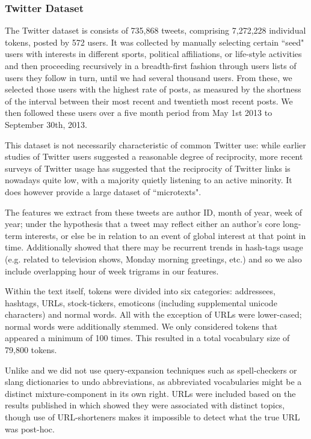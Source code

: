 \subsubsection*{Twitter Dataset}
The Twitter dataset is consists of 735,868 tweets, comprising 7,272,228 individual tokens, posted by 572 users. It was collected by manually selecting certain ``seed" users with interests in different sports, political affiliations, or life-style activities and then proceeding recursively in a breadth-first fashion through users lists of users they follow in turn, until we had several thousand users. From these, we selected those users with the highest rate of posts, as measured by the shortness of the interval between their most recent and twentieth most recent posts. We then followed these users over a five month period from May 1st 2013 to September 30th, 2013. 

This dataset is not necessarily characteristic of common Twitter use: while earlier studies of Twitter users suggested a reasonable degree of reciprocity\cite{Java2007}, more recent surveys of Twitter usage has suggested that the reciprocity of Twitter links is nowadays quite low, with a majority quietly listening to an active minority\cite{Kwak2010}. It does however provide a large dataset of ``microtexts".

The features we extract from these tweets are author ID, month of year, week of year; under the hypothesis that a tweet may reflect either an author's core long-term interests, or else be in relation to an event of global interest at that point in time. Additionally \cite{Preot2012} showed that there may be recurrent trends in hash-tags usage (e.g. related to television shows, Monday morning greetings, etc.) and so we also include overlapping hour of week trigrams in our features. 


Within the text itself, tokens were divided into six categories: addressees, hashtags, URLs, stock-tickers, emoticons (including supplemental unicode characters) and normal words. All with the exception of URLs were lower-cased; normal words were additionally stemmed. We only considered tokens that appeared a minimum of 100 times. This resulted in a total vocabulary size of 79,800 tokens. 

Unlike \cite{Wu2010} and \cite{Han2011} we did not use query-expansion techniques such as spell-checkers or slang dictionaries to undo abbreviations, as abbreviated vocabularies might be a distinct mixture-component in its own right. URLs were included based on the results published in \cite{Michelson2010} which showed they were associated with distinct topics, though use of URL-shorteners makes it impossible to detect what the true URL was post-hoc.

